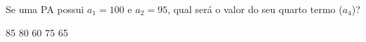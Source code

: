 Se uma PA possui $a_1 = 100$ e $a_2 = 95$, qual será o valor do seu quarto termo ($a_4$)?

85
80
60
75
65





